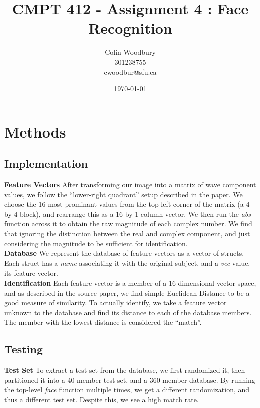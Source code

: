 \documentclass{article}
\begin{document}
\title{CMPT 412 - Assignment 4 : Face Recognition}
\author{Colin Woodbury\\ 301238755\\ cwoodbur@sfu.ca}
\date{\today}
\maketitle

\tableofcontents
\clearpage

\twocolumn

\section{Methods}
\subsection{Implementation}
\textbf{Feature Vectors}
After transforming our image into a matrix of wave component values, we
follow the ``lower-right quadrant'' setup described in the paper. We
choose the 16 most prominant values from the top left corner of the matrix
(a 4-by-4 block), and rearrange this as a 16-by-1 column vector. We then
run the \emph{abs} function across it to obtain the raw magnitude of
each complex number. We find that ignoring the distinction between the real
and complex component, and just considering the magnitude to be sufficient
for identification.\\

\textbf{Database} We represent the database of feature vectors as a vector
of structs. Each struct has a \emph{name} associating it with the
original subject, and a \emph{vec} value, its feature vector.\\

\textbf{Identification} Each feature vector is a member of a 16-dimensional
vector space, and as described in the source paper, we find simple Euclidean
Distance to be a good measure of similarity. To actually identify,
we take a feature vector unknown to the database and find its distance
to each of the database members. The member with the lowest distance
is considered the ``match''.

\subsection{Testing}
\textbf{Test Set} To extract a test set from the database, we first
randomized it, then partitioned it into a 40-member test set, and a
360-member database. By running the top-level \emph{face} function
multiple times, we get a different randomization, and thus a different
test set. Despite this, we see a high match rate.
\end{document}
